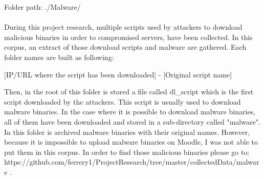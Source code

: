 
Folder path: ./Malware/

\paragraph{}    
During this project research, multiple scripts used by attackers to download malicious
binaries in order to compromised servers, have been collected. In this corpus, an extract
of those download scripts and malware are gathered.
Each folder names are built as following:
\begin{center}
[IP/URL where the script has been downloaded] - [Original script name]
\end{center}
Then, in the root of this folder is stored a file called dl\_script which is the first
script downloaded by the attackers. This script is usually used to download malware binaries.
In the case where it is possible to download malware binaries, all of them have been downloaded
and stored in a sub-directory called "malware". In this folder is archived malware binaries 
with their original names.
However, because it is impossible to upload malware binaries on Moodle, I was not able to put them
in this corpus. In order to find those malicious binaries please go to:
https://github.com/ferrery1/ProjectResearch/tree/master/collectedData/malware .
